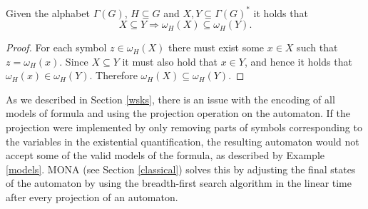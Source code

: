 \begin{lemma} Given the alphabet $\Gamma(G)$, $H \subseteq G$ and $X, Y
\subseteq \Gamma(G)^*$ it holds that
\begin{equation}
 X \subseteq Y \Longrightarrow \omega_H(X) \subseteq \omega_H(Y).
\end{equation}
\end{lemma}
\begin{proof}
For each symbol $z \in \omega_H(X)$ there must exist some $x \in X$ such that
$z = \omega_H(x)$. Since $X \subseteq Y$ it must also hold that $x \in Y$, and
hence it holds that $\omega_H(x) \in \omega_H(Y)$. Therefore $\omega_H(X)
\subseteq \omega_H(Y)$.
\end{proof}

As we described in Section \ref{wsks}, there is an issue with the encoding of
all models of formula and using the projection operation on the automaton. If
the projection were implemented by only removing parts of symbols corresponding to the
variables in the existential quantification, the resulting automaton
would not accept some of the valid models of the formula,
as described by Example \ref{models}. \textsc{MONA} (see Section
\ref{classical}) solves this by adjusting the final states of the automaton by
using the breadth-first search algorithm in the linear time after every
projection of an automaton.


